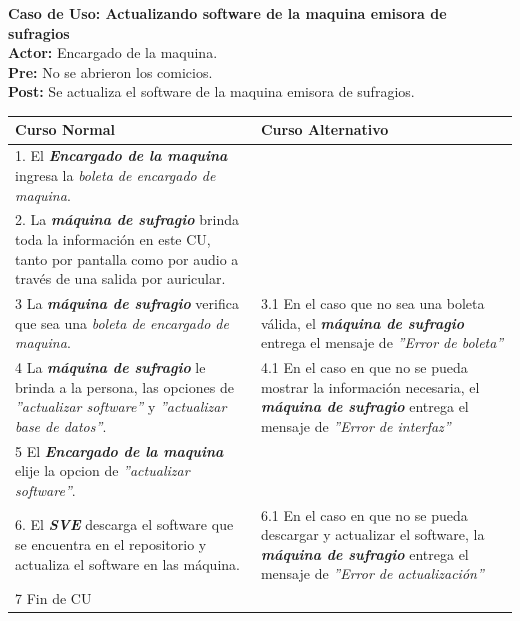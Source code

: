 \documentclass[spanish, 10pt,a4paper]{article}
\numberwithin{equation}{section} %
\begin{document}
\noindent\textbf{Caso de Uso: Actualizando software de la maquina emisora de sufragios}\\
\textbf{Actor: } Encargado de la maquina.\\
\textbf{Pre: } No se abrieron los comicios.\\
\textbf{Post: } Se actualiza el software de la maquina emisora de sufragios.\\
\begin{table}[H]
  \centering
\bgroup
\def\arraystretch{1.3}
  \begin{tabular}{p{9cm} | p{7cm}}
    \hline
    Curso Normal & Curso Alternativo \\
    \hline
    \hline    
    1. El \textbf{\textit{Encargado de la maquina}} ingresa la \textit{boleta de encargado de maquina}. 
    & \\
    
    \hline
    2. La \textbf{\textit{máquina de sufragio}} brinda toda la información en este CU, tanto por pantalla como por audio a través de una salida por auricular.
    &
    \\
    
    \hline
    3 La \textbf{\textit{máquina de sufragio}} verifica que sea una \textit{boleta de encargado de maquina}.
    & 
    3.1 En el caso que no sea una boleta válida, el \textbf{\textit{máquina de sufragio}} entrega el mensaje de \textit{''Error de boleta''}
    \\
    
    \hline
    4 La \textbf{\textit{máquina de sufragio}} le brinda a la persona, las opciones de \textit{''actualizar software''} y \textit{''actualizar base de datos''}.
    & 
    4.1 En el caso en que no se pueda mostrar la información necesaria, el \textbf{\textit{máquina de sufragio}} entrega el mensaje de \textit{''Error de interfaz''}
    \\
    
    \hline
    5 El \textbf{\textit{Encargado de la maquina}} elije la opcion de \textit{''actualizar software''}.
    & \\
    
    \hline
    6. El \textbf{\textit{SVE}} descarga el software que se encuentra en el repositorio y actualiza el software en las máquina.
    &
    6.1 En el caso en que no se pueda descargar y actualizar el software, la \textbf{\textit{máquina de sufragio}} entrega el mensaje de \textit{''Error de actualización''}
    \\
    
    \hline
    7 Fin de CU
    & \\
    \hline
  \end{tabular}
\egroup
\end{table}
\end{document}
